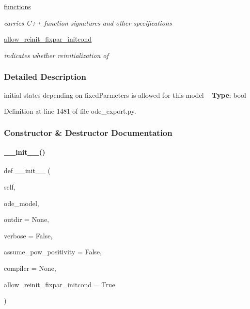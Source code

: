\begin{DoxyCompactItemize}
\mbox{\hyperlink{classamici_1_1ode__export_1_1_o_d_e_exporter_a2cb6c540c07a402759bab624703ecdb2}{functions}}
\begin{DoxyCompactList}\small\item\em carries C++ function signatures and other specifications \end{DoxyCompactList}\item 
\mbox{\label{classamici_1_1ode__export_1_1_o_d_e_exporter_a50ba58e6df269149d17dda632a15620a}} 
\mbox{\hyperlink{classamici_1_1ode__export_1_1_o_d_e_exporter_a50ba58e6df269149d17dda632a15620a}{allow\+\_\+reinit\+\_\+fixpar\+\_\+initcond}}
\begin{DoxyCompactList}\small\item\em indicates whether reinitialization of \end{DoxyCompactList}\end{DoxyCompactItemize}


\subsubsection{Detailed Description}
initial states depending on fixed\+Parmeters is allowed for this model ~\newline
{\bfseries Type}\+: bool 

Definition at line 1481 of file ode\+\_\+export.\+py.



\subsubsection{Constructor \& Destructor Documentation}
\mbox{\label{classamici_1_1ode__export_1_1_o_d_e_exporter_ade5a56f9eda68f70b441b904113d766b}} 
\paragraph{\texorpdfstring{\+\_\+\+\_\+init\+\_\+\+\_\+()}{\_\_init\_\_()}}
{\footnotesize\ttfamily def \+\_\+\+\_\+init\+\_\+\+\_\+ (\begin{DoxyParamCaption}\item[{}]{self,  }\item[{}]{ode\+\_\+model,  }\item[{}]{outdir = {\ttfamily None},  }\item[{}]{verbose = {\ttfamily False},  }\item[{}]{assume\+\_\+pow\+\_\+positivity = {\ttfamily False},  }\item[{}]{compiler = {\ttfamily None},  }\item[{}]{allow\+\_\+reinit\+\_\+fixpar\+\_\+initcond = {\ttfamily True} }\end{DoxyParamCaption})}


